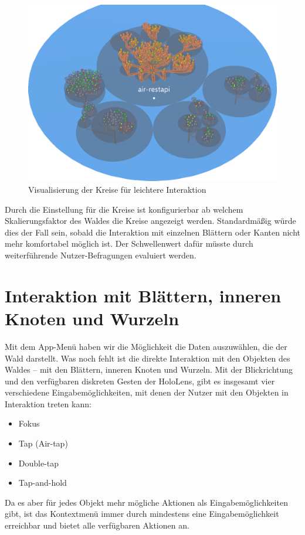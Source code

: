 \begin{figure}[htb]
  \includegraphics[width=.8\textwidth]{figures/circle-hover}
  \caption{Visualisierung der Kreise für leichtere Interaktion}
  \label{fig:circle-hover}
\end{figure}

Durch die Einstellung für die Kreise ist konfigurierbar ab welchem Skalierungsfaktor des Waldes die Kreise angezeigt werden. Standardmäßig würde dies der Fall sein, sobald die Interaktion mit einzelnen Blättern oder Kanten nicht mehr komfortabel möglich ist. Der Schwellenwert dafür müsste durch weiterführende Nutzer-Befragungen evaluiert werden.

\section{Interaktion mit Blättern, inneren Knoten und Wurzeln}
\label{sec:object-interaction}

Mit dem App-Menü haben wir die Möglichkeit die Daten auszuwählen, die der Wald darstellt. Was noch fehlt ist die direkte Interaktion mit den Objekten des Waldes -- mit den Blättern, inneren Knoten und Wurzeln. Mit der Blickrichtung und den verfügbaren diskreten Gesten der HoloLens, gibt es insgesamt vier verschiedene Eingabemöglichkeiten, mit denen der Nutzer mit den Objekten in Interaktion treten kann:

\begin{itemize}
  \item Fokus
  \item Tap (Air-tap)
  \item Double-tap
  \item Tap-and-hold
\end{itemize}

Da es aber für jedes Objekt mehr mögliche Aktionen als Eingabemöglichkeiten gibt, ist das Kontextmenü immer durch mindestens eine Eingabemöglichkeit erreichbar und bietet alle verfügbaren Aktionen an.

